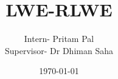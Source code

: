 \documentclass{beamer}
\title{LWE-RLWE}
\author[Pritam Pal]{Intern- Pritam Pal \\ [0.5cm] \small{ Supervisor- Dr Dhiman Saha}}
\institute{IIT Bhilai, CG, India}
\date{\today}
\begin{document}
	
	
	\begin{frame}
		\titlepage
		
	\end{frame}
\end{document}
